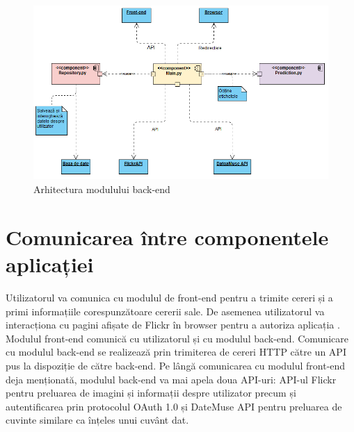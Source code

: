  \begin{figure}[!htbp]
    \begin{center}
        \includegraphics[width=1.0\textwidth]{images/back_end.png}
        \caption{Arhitectura modulului back-end}
    \end{center}
\end{figure}


\pagebreak
\section{Comunicarea între componentele aplicației}
Utilizatorul va comunica cu modulul de front-end pentru a trimite cereri și a primi informațiile corespunzătoare cererii sale. De asemenea utilizatorul va interacționa cu pagini afișate de Flickr în browser pentru a autoriza aplicația {\applicationtitle}.
Modulul front-end comunică cu utilizatorul și cu modulul back-end. Comunicare cu modulul back-end se realizează prin trimiterea de cereri HTTP \cite{http-requests} către un API pus la dispoziție de către back-end.
Pe lângă comunicarea cu modulul front-end deja menționată, modulul back-end va mai apela doua API-uri: API-ul Flickr pentru preluarea de imagini și informații despre utilizator precum și autentificarea prin protocolul OAuth 1.0 și DateMuse API pentru preluarea de cuvinte similare ca înțeles unui cuvânt dat.


